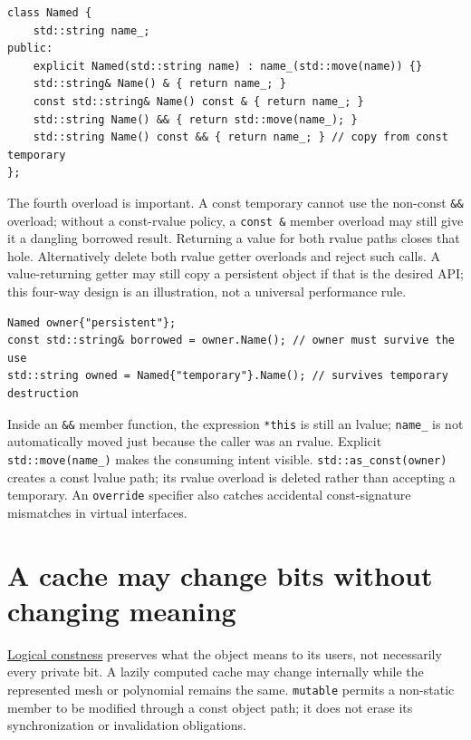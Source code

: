 \begin{verbatim}
class Named {
    std::string name_;
public:
    explicit Named(std::string name) : name_(std::move(name)) {}
    std::string& Name() & { return name_; }
    const std::string& Name() const & { return name_; }
    std::string Name() && { return std::move(name_); }
    std::string Name() const && { return name_; } // copy from const temporary
};
\end{verbatim}

The fourth overload is important. A const temporary cannot use the non-const \texttt{\&\&} overload; without a const-rvalue policy, a \texttt{const\ \&} member overload may still give it a dangling borrowed result. Returning a value for both rvalue paths closes that hole. Alternatively delete both rvalue getter overloads and reject such calls. A value-returning getter may still copy a persistent object if that is the desired API; this four-way design is an illustration, not a universal performance rule.

\begin{verbatim}
Named owner{"persistent"};
const std::string& borrowed = owner.Name(); // owner must survive the use
std::string owned = Named{"temporary"}.Name(); // survives temporary destruction
\end{verbatim}

Inside an \texttt{\&\&} member function, the expression \texttt{*this} is still an lvalue; \texttt{name\_} is not automatically moved just because the caller was an rvalue. Explicit \texttt{std::move(name\_)} makes the consuming intent visible. \texttt{std::as\_const(owner)} creates a const lvalue path; its rvalue overload is deleted rather than accepting a temporary. An \texttt{override} specifier also catches accidental const-signature mismatches in virtual interfaces.

\section{A cache may change bits without changing meaning}\label{01-foundations-i-ch003-a-cache-may-change-bits-without-changing-meaning}

\hypertarget{01-foundations-i-ch003-a-cache-may-change-bits-without-changing-meaning}{}

\hyperref[appendix-f5593256bcaf]{Logical constness} preserves what the object means to its users, not necessarily every private bit. A lazily computed cache may change internally while the represented mesh or polynomial remains the same. \texttt{mutable} permits a non-static member to be modified through a const object path; it does not erase its synchronization or invalidation obligations.


